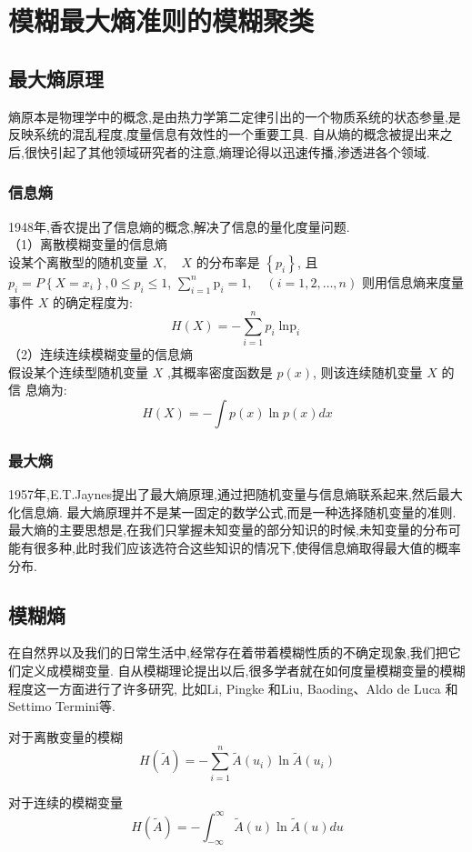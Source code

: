 \chapter[模糊最大熵准则的模糊聚类模型]{模糊最大熵准则的模糊聚类}

\section{最大熵原理}
熵原本是物理学中的概念,是由热力学第二定律引出的一个物质系统的状态参量,是反映系统的混乱程度,度量信息有效性的一个重要工具.
自从熵的概念被提出来之后,很快引起了其他领域研究者的注意,熵理论得以迅速传播,渗透进各个领域.
\subsection{信息熵}
1948年,香农\cite{1948A}提出了信息熵的概念,解决了信息的量化度量问题.\\
（1）离散模糊变量的信息熵\\
设某个离散型的随机变量 $X, \quad X$ 的分布率是 $\left\{p_{i}\right\}$, 且 $p_{i}=P\left\{X=x_{i}\right\}, 0 \leq p_{i} \leq 1$,
$\sum_{i=1}^n \mathrm{p}_i=1, \quad(i=1,2 ,\dots, n)$ 则用信息熵来度量事件 $X$ 的确定程度为:
\begin{equation}
    H(X) =-\sum_{i=1}^{n} p_{i} \operatorname{\ln p}_{i}
\end{equation}
（2）连续连续模糊变量的信息熵\\
假设某个连续型随机变量 $X$ ,其概率密度函数是 $p(x)$, 则该连续随机变量 $X$ 的信
息熵为:
\begin{equation}
    H(X)=-\int p(x) \ln p(x) d x
\end{equation}

\subsection{最大熵}
1957年,E.T.Jaynes提出了最大熵原理,通过把随机变量与信息熵联系起来,然后最大化信息熵.
最大熵原理并不是某一固定的数学公式,而是一种选择随机变量的准则.
最大熵的主要思想是,在我们只掌握未知变量的部分知识的时候,未知变量的分布可能有很多种,此时我们应该选符合这些知识的情况下,使得信息熵取得最大值的概率分布.

\section{模糊熵}
在自然界以及我们的日常生活中,经常存在着带着模糊性质的不确定现象,我们把它们定义成模糊变量.
自从模糊理论提出以后,很多学者就在如何度量模糊变量的模糊程度这一方面进行了许多研究,
比如Li, Pingke 和Liu, Baoding\cite{li2008entropy}、Aldo de Luca 和 Settimo Termini\cite{RN3}等.
\begin{definition}[模糊熵]
    对于离散变量的模糊
    \begin{equation}
        H(\tilde{A})=-\sum_{i=1}^{n}\tilde{A}(u_i) \ln \tilde{A}(u_i)
    \end{equation}

    对于连续的模糊变量
    \begin{equation}
        H(\tilde{A})=-\int_{-\infty}^{\infty}\tilde{A}(u) \ln \tilde{A}(u) d u
    \end{equation}

\end{definition}

